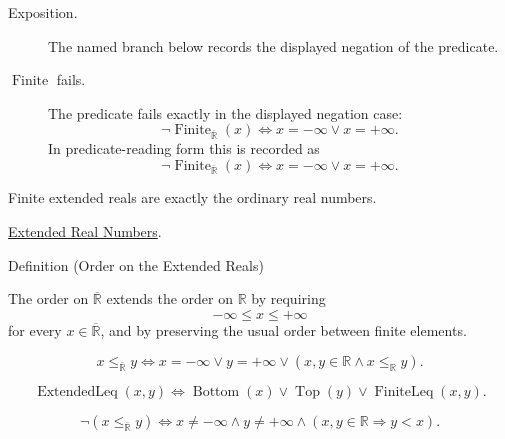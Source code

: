 \begin{remark*}
\begin{description}
  \item[Exposition.] The named branch below records the displayed negation of the predicate.
  \item[\(\operatorname{Finite}\) fails.] The predicate fails exactly in the displayed negation case:
  \[
  \neg\operatorname{Finite}_{\overline{\mathbb{R}}}(x)
  \Longleftrightarrow x=-\infty\lor x=+\infty.
  \]
  In predicate-reading form this is recorded as
  \[
  \neg\operatorname{Finite}_{\overline{\mathbb{R}}}(x)
  \Longleftrightarrow x=-\infty\lor x=+\infty.
  \]
\end{description}
\end{remark*}
\begin{remark*}[Interpretation]
Finite extended reals are exactly the ordinary real numbers.
\end{remark*}
\begin{dependencies}
\hyperref[def:extended-real-numbers]{Extended Real Numbers}.
\end{dependencies}

\begin{definitionbox}{Definition (Order on the Extended Reals)}
\begin{definition}
\label{def:extended-real-order}
The order on $\overline{\mathbb{R}}$ extends the order on $\mathbb{R}$ by
requiring
\[
-\infty\le x\le +\infty
\]
for every $x\in\overline{\mathbb{R}}$, and by preserving the usual order
between finite elements.
\end{definition}
\end{definitionbox}
\begin{remark*}
\[
x\le_{\overline{\mathbb{R}}}y
\Longleftrightarrow
x=-\infty\lor y=+\infty\lor
(x,y\in\mathbb{R}\land x\le_{\mathbb{R}}y).
\]
\end{remark*}
\begin{remark*}
\[
\operatorname{ExtendedLeq}(x,y)
\Longleftrightarrow
\operatorname{Bottom}(x)\lor\operatorname{Top}(y)\lor
\operatorname{FiniteLeq}(x,y).
\]
\end{remark*}
\begin{remark*}
\[
\neg(x\le_{\overline{\mathbb{R}}}y)
\Longleftrightarrow
x\ne-\infty\land y\ne+\infty\land
(x,y\in\mathbb{R}\Rightarrow y<x).
\]
\end{remark*}

